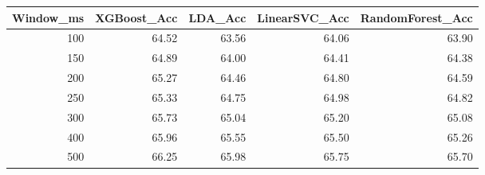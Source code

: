 \begin{tabular}{rrrrr}
\toprule
Window_ms & XGBoost_Acc & LDA_Acc & LinearSVC_Acc & RandomForest_Acc \\
\midrule
100 & 64.52 & 63.56 & 64.06 & 63.90 \\
150 & 64.89 & 64.00 & 64.41 & 64.38 \\
200 & 65.27 & 64.46 & 64.80 & 64.59 \\
250 & 65.33 & 64.75 & 64.98 & 64.82 \\
300 & 65.73 & 65.04 & 65.20 & 65.08 \\
400 & 65.96 & 65.55 & 65.50 & 65.26 \\
500 & 66.25 & 65.98 & 65.75 & 65.70 \\
\bottomrule
\end{tabular}
